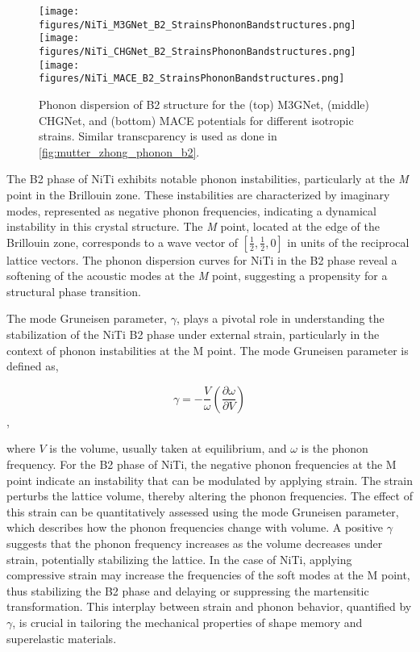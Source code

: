 \documentclass[preprint]{elsarticle}
\begin{document}

\begin{figure}[!htp]
    \begin{centering}
      \texttt{[image: figures/NiTi\_M3GNet\_B2\_StrainsPhononBandstructures.png]}
      \vspace{1mm}
      \texttt{[image: figures/NiTi\_CHGNet\_B2\_StrainsPhononBandstructures.png]}
      \vspace{1mm}
      \texttt{[image: figures/NiTi\_MACE\_B2\_StrainsPhononBandstructures.png]}
      \caption{
        Phonon dispersion of B2 structure for the (top) M3GNet, (middle) CHGNet, and (bottom) MACE potentials for different isotropic strains. Similar transcparency is used as done in \ref{fig:mutter_zhong_phonon_b2}.
      }
      \label{fig:gnn_phonon_b2}
    \end{centering}
\end{figure}


The B2 phase of NiTi exhibits notable phonon instabilities, particularly at the \textit{M} point in the Brillouin zone. These instabilities are characterized by imaginary modes, represented as negative phonon frequencies, indicating a dynamical instability in this crystal structure. The \textit{M} point, located at the edge of the Brillouin zone, corresponds to a wave vector of $\left[\frac{1}{2}, \frac{1}{2}, 0\right]$ in units of the reciprocal lattice vectors. The phonon dispersion curves for NiTi in the B2 phase reveal a softening of the acoustic modes at the \textit{M} point, suggesting a propensity for a structural phase transition. \par

The mode Gruneisen parameter, $\gamma$, plays a pivotal role in understanding the stabilization of the NiTi B2 phase under external strain, particularly in the context of phonon instabilities at the M point. The mode Gruneisen parameter is defined as,

\begin{equation}
  \label{eq:modegruneisen}
  \gamma = -\frac{V}{\omega}\left(\frac{\partial \omega}{\partial V}\right)
\end{equation},

where $V$ is the volume, usually taken at equilibrium, and $\omega$ is the phonon frequency. For the B2 phase of NiTi, the negative phonon frequencies at the M point indicate an instability that can be modulated by applying strain. The strain perturbs the lattice volume, thereby altering the phonon frequencies. The effect of this strain can be quantitatively assessed using the mode Gruneisen parameter, which describes how the phonon frequencies change with volume. A positive $\gamma$ suggests that the phonon frequency increases as the volume decreases under strain, potentially stabilizing the lattice. In the case of NiTi, applying compressive strain may increase the frequencies of the soft modes at the M point, thus stabilizing the B2 phase and delaying or suppressing the martensitic transformation. This interplay between strain and phonon behavior, quantified by $\gamma$, is crucial in tailoring the mechanical properties of shape memory and superelastic materials.
\end{document}
